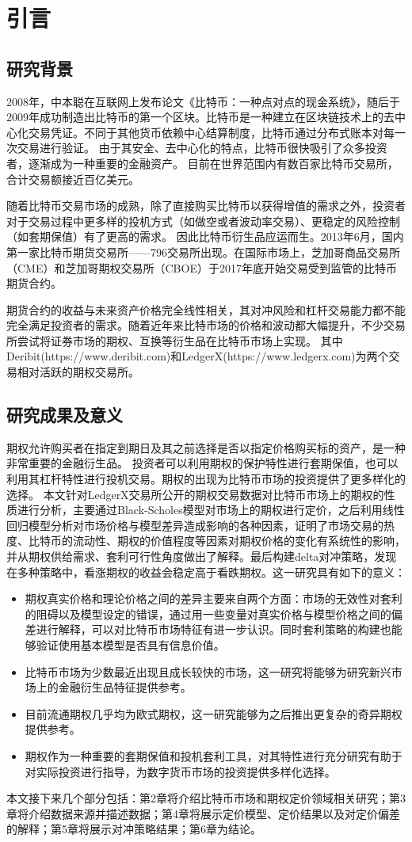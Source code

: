 \chapter{引言}
\section{研究背景}
\par{2008年，中本聪在互联网上发布论文《比特币：一种点对点的现金系统》\cite{Nakamoto_bitcoin:a}，随后于2009年成功制造出比特币的第一个区块。比特币是一种建立在区块链技术上的去中心化交易凭证。不同于其他货币依赖中心结算制度，比特币通过分布式账本对每一次交易进行验证。
由于其安全、去中心化的特点，比特币很快吸引了众多投资者，逐渐成为一种重要的金融资产。
目前在世界范围内有数百家比特币交易所，合计交易额接近百亿美元。
}
\par{随着比特币交易市场的成熟，除了直接购买比特币以获得增值的需求之外，投资者对于交易过程中更多样的投机方式（如做空或者波动率交易）、更稳定的风险控制（如套期保值）有了更高的需求。
因此比特币衍生品应运而生。2013年6月，国内第一家比特币期货交易所——796交易所出现。在国际市场上，芝加哥商品交易所（CME）和芝加哥期权交易所（CBOE）于2017年底开始交易受到监管的比特币期货合约。
}
\par{期货合约的收益与未来资产价格完全线性相关，其对冲风险和杠杆交易能力都不能完全满足投资者的需求。随着近年来比特市场的价格和波动都大幅提升，不少交易所尝试将证券市场的期权、互换等衍生品在比特币市场上实现。
其中Deribit(https://www.deribit.com)和LedgerX(https://www.ledgerx.com)为两个交易相对活跃的期权交易所。}
\section{研究成果及意义}
期权允许购买者在指定到期日及其之前选择是否以指定价格购买标的资产，是一种非常重要的金融衍生品。
投资者可以利用期权的保护特性进行套期保值，也可以利用其杠杆特性进行投机交易。期权的出现为比特币市场的投资提供了更多样化的选择。
本文针对LedgerX交易所公开的期权交易数据对比特币市场上的期权的性质进行分析，主要通过Black-Scholes模型对市场上的期权进行定价，之后利用线性回归模型分析对市场价格与模型差异造成影响的各种因素，证明了市场交易的热度、比特币的流动性、期权的价值程度等因素对期权价格的变化有系统性的影响，并从期权供给需求、套利可行性角度做出了解释。最后构建delta对冲策略，发现在多种策略中，看涨期权的收益会稳定高于看跌期权。这一研究具有如下的意义：
\begin{itemize}
    \item 期权真实价格和理论价格之间的差异主要来自两个方面：市场的无效性对套利的阻碍以及模型设定的错误，通过用一些变量对真实价格与模型价格之间的偏差进行解释，可以对比特币市场特征有进一步认识。同时套利策略的构建也能够验证使用基本模型是否具有信息价值。
    \item  比特币市场为少数最近出现且成长较快的市场，这一研究将能够为研究新兴市场上的金融衍生品特征提供参考。
    \item 目前流通期权几乎均为欧式期权，这一研究能够为之后推出更复杂的奇异期权提供参考。
    \item 期权作为一种重要的套期保值和投机套利工具，对其特性进行充分研究有助于对实际投资进行指导，为数字货币市场的投资提供多样化选择。
  \end{itemize}
  
本文接下来几个部分包括：第2章将介绍比特币市场和期权定价领域相关研究；第3章将介绍数据来源并描述数据；第4章将展示定价模型、定价结果以及对定价偏差的解释；第5章将展示对冲策略结果；第6章为结论。